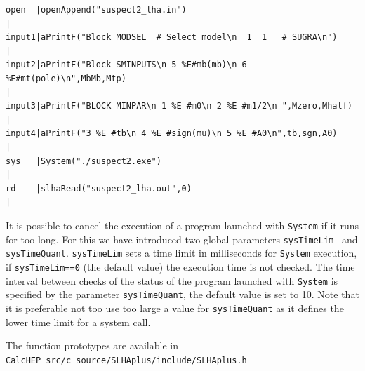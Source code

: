 \documentclass[12pt,a4paper]{article}
\begin{document}
\begin{verbatim}
open  |openAppend("suspect2_lha.in")                                                                                                                                                                                                                             |
input1|aPrintF("Block MODSEL  # Select model\n  1  1   # SUGRA\n")                                                                                                                                                                              |
input2|aPrintF("Block SMINPUTS\n 5 %E#mb(mb)\n 6 %E#mt(pole)\n",MbMb,Mtp)                                                                                                                                                               |
input3|aPrintF("BLOCK MINPAR\n 1 %E #m0\n 2 %E #m1/2\n ",Mzero,Mhalf)                                                                                                                                          |
input4|aPrintF("3 %E #tb\n 4 %E #sign(mu)\n 5 %E #A0\n",tb,sgn,A0)                                                                                                                                          |
sys   |System("./suspect2.exe")                                                                                                                                                                                                                                 |
rd    |slhaRead("suspect2_lha.out",0)                                                                                                                                                                                                                           |
\end{verbatim}

It is possible to cancel the execution of a program launched with  \verb|System|  if it runs for too long. For this we have introduced two
global parameters  {\tt  sysTimeLim } and {\tt  sysTimeQuant}.
{\tt  sysTimeLim} sets a time limit  in milliseconds for {\tt System} execution, if 
{\tt  sysTimeLim==0} (the default value) the execution time is not checked. 
The time interval between checks of the status of the program launched with  \verb|System|  is specified by the parameter
{\tt sysTimeQuant}, the default value is set to 10.  
Note that it is preferable not too use too large a value for {\tt sysTimeQuant} as it defines the lower time limit for a system call. 



The  function prototypes are available  in \\
\verb|CalcHEP_src/c_source/SLHAplus/include/SLHAplus.h|
\end{document}
